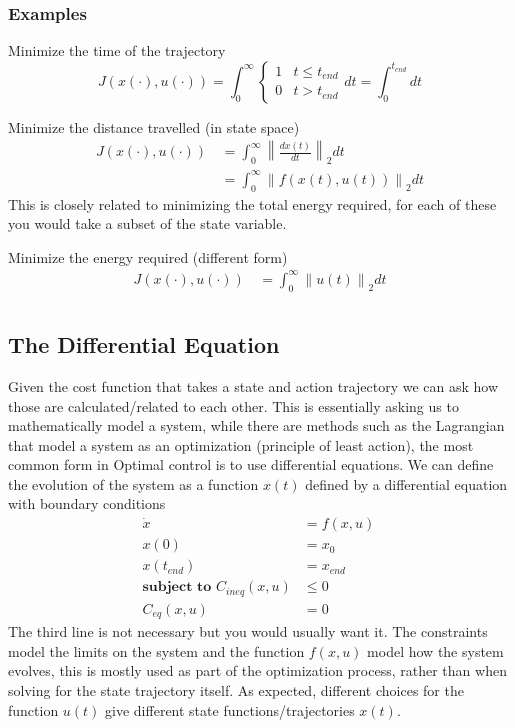 \documentclass[a4paper, 10pt, twocolumn]{article}
\begin{document}
\subsubsection{Examples}

Minimize the time of the trajectory
\begin{equation}
    J(x(\cdot), u(\cdot))  = \int_{0}^{\infty}
    \begin{cases}
        1 & t \leq t_{end} \\
        0 & t > t_{end}
    \end{cases}
    dt = \int_{0}^{t_{end}} dt
\end{equation}

Minimize the distance travelled (in state space)
\begin{align*}
    J(x(\cdot), u(\cdot))\,
     & = \int_{0}^{\infty } \left\| \frac{dx(t)}{dt}  \right\|_2 dt \\
     & = \int_{0}^{\infty } \left\| f(x(t), u(t)) \right\|_2 dt
\end{align*}
This is closely related to minimizing the total energy required, for each of these you would take a subset of the state variable.

Minimize the energy required (different form)
\begin{align*}
    J(x(\cdot), u(\cdot))\,
     & = \int_{0}^{\infty } \left\| u(t)  \right\|_2 dt \\
\end{align*}

\subsection{The Differential Equation}
Given the cost function that takes a state and action trajectory we can ask how those are calculated/related to each other.
This is essentially asking us to mathematically model a system, while there are methods such as the Lagrangian that model a system as an optimization (principle of least action), the most common form in Optimal control is to use differential equations.
We can define the evolution of the system as a function \(x(t)\) defined by a differential equation with boundary conditions
\begin{align*}
    \dot{x}        & = f(x, u)\, \\
    x(0)           & = x_0       \\
    x(t_{end})\    & = x_{end}\, \\
    \textbf{subject to }
    C_{ineq}(x, u) & \leq 0      \\
    C_{eq}(x, u)   & = 0
\end{align*}
The third line is not necessary but you would usually want it. The constraints model the limits on the system and the function \(f(x,u)\) model how the system evolves, this is mostly used as part of the optimization process, rather than when solving for the state trajectory itself. As expected, different choices for the function \(u(t)\) give different state functions/trajectories \(x(t)\).
\end{document}
